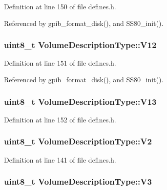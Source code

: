 Definition at line 150 of file defines.\-h.



Referenced by gpib\-\_\-format\-\_\-disk(), and S\-S80\-\_\-init().

\hypertarget{structVolumeDescriptionType_a96c6874117e4b64341e6c207bde061ae}{
\subsubsection[{V12}]{\setlength{\rightskip}{0pt plus 5cm}uint8\-\_\-t Volume\-Description\-Type\-::\-V12}}\label{structVolumeDescriptionType_a96c6874117e4b64341e6c207bde061ae}


Definition at line 151 of file defines.\-h.



Referenced by gpib\-\_\-format\-\_\-disk(), and S\-S80\-\_\-init().

\hypertarget{structVolumeDescriptionType_ad3a75e21b674eadfa0db9d9df9672e16}{
\subsubsection[{V13}]{\setlength{\rightskip}{0pt plus 5cm}uint8\-\_\-t Volume\-Description\-Type\-::\-V13}}\label{structVolumeDescriptionType_ad3a75e21b674eadfa0db9d9df9672e16}


Definition at line 152 of file defines.\-h.

\hypertarget{structVolumeDescriptionType_a0c89f2c3b579944fb549107411d97213}{
\subsubsection[{V2}]{\setlength{\rightskip}{0pt plus 5cm}uint8\-\_\-t Volume\-Description\-Type\-::\-V2}}\label{structVolumeDescriptionType_a0c89f2c3b579944fb549107411d97213}


Definition at line 141 of file defines.\-h.

\hypertarget{structVolumeDescriptionType_a2a6a98d42bff4b72a02f562f1be113d2}{
\subsubsection[{V3}]{\setlength{\rightskip}{0pt plus 5cm}uint8\-\_\-t Volume\-Description\-Type\-::\-V3}}\label{structVolumeDescriptionType_a2a6a98d42bff4b72a02f562f1be113d2}



